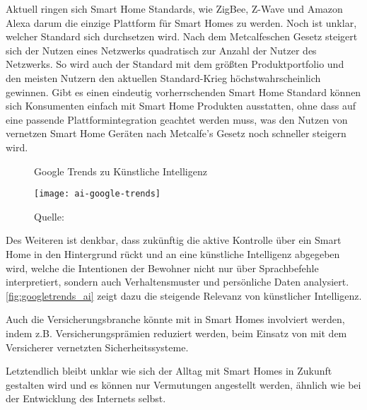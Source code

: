 Aktuell ringen sich Smart Home Standards, wie ZigBee, Z-Wave und Amazon Alexa darum die einzige Plattform für Smart Homes zu werden.
Noch ist unklar, welcher Standard sich durchsetzen wird.
Nach dem Metcalfeschen Gesetz steigert sich der Nutzen eines Netzwerks quadratisch zur Anzahl der Nutzer des Netzwerks.
So wird auch der Standard mit dem größten Produktportfolio und den meisten Nutzern den aktuellen Standard-Krieg höchstwahrscheinlich gewinnen.
Gibt es einen eindeutig vorherrschenden Smart Home Standard können sich Konsumenten einfach mit Smart Home Produkten ausstatten, ohne dass auf eine passende Plattformintegration geachtet werden muss, was den Nutzen von vernetzen Smart Home Geräten nach Metcalfe's Gesetz noch schneller steigern wird.

\begin{figure}[ht]
	\centering
	\caption{Google Trends zu Künstliche Intelligenz}
	\texttt{[image: ai-google-trends]}
	\caption*{\footnotesize{Quelle: }}
	\label{fig:googletrends_ai}
\end{figure}

Des Weiteren ist denkbar, dass zukünftig die aktive Kontrolle über ein Smart Home in den Hintergrund rückt und an eine künstliche Intelligenz abgegeben wird, welche die Intentionen der Bewohner nicht nur über Sprachbefehle interpretiert, sondern auch Verhaltensmuster und persönliche Daten analysiert.
\autoref{fig:googletrends_ai} zeigt dazu die steigende Relevanz von künstlicher Intelligenz.

Auch die Versicherungsbranche könnte mit in Smart Homes involviert werden, indem z.B. Versicherungsprämien reduziert werden, beim Einsatz von mit dem Versicherer vernetzten Sicherheitssysteme.

Letztendlich bleibt unklar wie sich der Alltag mit Smart Homes in Zukunft gestalten wird und es können nur Vermutungen angestellt werden, ähnlich wie bei der Entwicklung des Internets selbst.